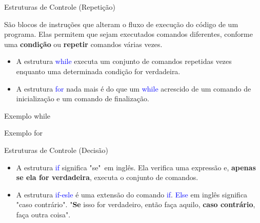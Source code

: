 \begin{frame}{Estruturas de Controle (Repetição)}
	\begin{block}{}
		São blocos de instruções que alteram o fluxo de execução do código de um programa. Elas permitem que sejam executados comandos diferentes, conforme uma \textbf{condição} ou \textbf{repetir} comandos várias vezes.
	\end{block}
	
	\begin{itemize}
		\item A estrutura \textcolor{blue}{while} executa um conjunto de comandos repetidas vezes enquanto uma determinada condição for verdadeira.
		\item  A estrutura \textcolor{blue}{for} nada mais é do que um \textcolor{blue}{while} acrescido de um comando de inicialização e um comando de finalização.
	\end{itemize}
	
	\begin{figure}[ht!]
		\centering
		\hfill
	\end{figure}
\end{frame}

\begin{frame}{Exemplo while}
	
\end{frame}

\begin{frame}{Exemplo for}
	
\end{frame}

\begin{frame}{Estruturas de Controle (Decisão)}		
	\begin{itemize}
		\item A estrutura \textcolor{blue}{if} significa "se"~em inglês. Ela verifica uma expressão e, \textbf{apenas se ela for verdadeira}, executa o conjunto de comandos.
		\item  A estrutura \textcolor{blue}{if-esle} é uma extensão do comando \textcolor{blue}{if}. \textcolor{blue}{Else} em inglês significa "caso contrário". "\textbf{Se} isso for verdadeiro, então faça aquilo, \textbf{caso contrário}, faça outra coisa".
	\end{itemize}
	
	\begin{figure}[ht!]
		\centering
		\hfil
	\end{figure}
\end{frame}

